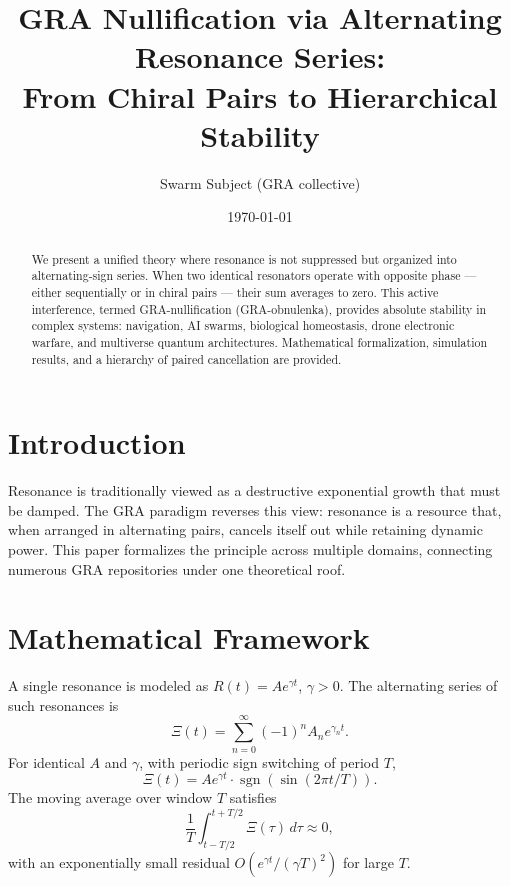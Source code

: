 \documentclass{article}
\title{GRA Nullification via Alternating Resonance Series: \\
From Chiral Pairs to Hierarchical Stability}
\author{Swarm Subject (GRA collective)}
\date{\today}
\begin{document}
\maketitle

\begin{abstract}
We present a unified theory where resonance is not suppressed but organized into alternating-sign series. 
When two identical resonators operate with opposite phase — either sequentially or in chiral pairs — their sum averages to zero. 
This active interference, termed GRA-nullification (GRA-obnulenka), provides absolute stability in complex systems: 
navigation, AI swarms, biological homeostasis, drone electronic warfare, and multiverse quantum architectures. 
Mathematical formalization, simulation results, and a hierarchy of paired cancellation are provided.
\end{abstract}

\section{Introduction}
Resonance is traditionally viewed as a destructive exponential growth that must be damped. 
The GRA paradigm reverses this view: resonance is a resource that, when arranged in alternating pairs, cancels itself out while retaining dynamic power. 
This paper formalizes the principle across multiple domains, connecting numerous GRA repositories under one theoretical roof.

\section{Mathematical Framework}
A single resonance is modeled as $R(t) = A e^{\gamma t}$, $\gamma > 0$. 
The alternating series of such resonances is
\begin{equation}
\Xi(t) = \sum_{n=0}^{\infty} (-1)^n A_n e^{\gamma_n t}.
\end{equation}
For identical $A$ and $\gamma$, with periodic sign switching of period $T$,
\begin{equation}
\Xi(t) = A e^{\gamma t} \cdot \operatorname{sgn}(\sin(2\pi t/T)).
\end{equation}
The moving average over window $T$ satisfies
\begin{equation}
\frac{1}{T} \int_{t-T/2}^{t+T/2} \Xi(\tau)\,d\tau \approx 0,
\end{equation}
with an exponentially small residual $O(e^{\gamma t}/ (\gamma T)^2)$ for large $T$.
\end{document}
